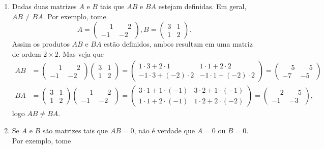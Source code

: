 \begin{observacoes}
\begin{enumerate}[label={\arabic*})]
        \item Dadas duas matrizes $A$ e $B$ tais que $AB$ e $BA$ estejam definidas. Em geral, $AB \ne BA$. Por exemplo, tome
            \[
                A = \begin{pmatrix}\phantom{-}1& \phantom{-}2\\-1 & -2\end{pmatrix},
                B = \begin{pmatrix}3 & 1 \\ 1 & 2\end{pmatrix}.
            \]
            Assim os produtos $AB$ e $BA$ estão definidos, ambos resultam em uma matriz de ordem $2 \times 2$. Mas veja que
            \begin{align*}
                AB &= \begin{pmatrix}\phantom{-}1 & \phantom{-}2\\-1 & -2\end{pmatrix}\begin{pmatrix}3 & 1\\1 & 2\end{pmatrix} =
                \begin{pmatrix}1\cdot 3 + 2 \cdot 1 & 1\cdot 1 + 2 \cdot 2\\-1\cdot3 + (-2)\cdot 2 & -1\cdot 1+ (-2)\cdot 2\end{pmatrix} =
                \begin{pmatrix}\phantom{-}5 & \phantom{-}5\\-7 & -5\end{pmatrix}\\
                BA &=\begin{pmatrix}3 & 1\\1 & 2\end{pmatrix}\begin{pmatrix}\phantom{-}1 & \phantom{-}2\\-1 & -2\end{pmatrix} = \begin{pmatrix}3\cdot 1 +
                1\cdot(-1) & 3\cdot 2 + 1\cdot(-1)\\1\cdot 1 + 2\cdot(-1) & 1\cdot 2 + 2 \cdot(-2)\end{pmatrix} =
                \begin{pmatrix}\phantom{-}2 & \phantom{-}5\\-1 & -3\end{pmatrix},
            \end{align*}
            logo $AB \ne BA$.
        \item Se $A$ e $B$ são matrizes tais que $AB = 0$, não é verdade que $A = 0$ ou $B = 0$. Por exemplo, tome

\end{enumerate}
\end{observacoes}
